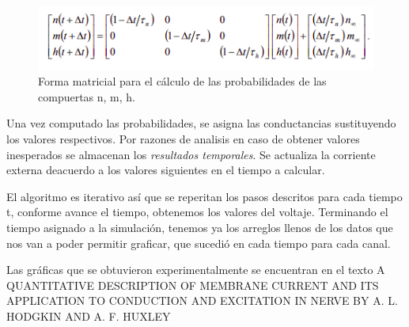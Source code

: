 \begin{figure}[H]
 \centering
 \includegraphics[scale=0.7]{../Figuras/matrix.png}
 \caption{Forma matricial para el cálculo de las probabilidades de las compuertas n, m, h.}
 \label{fig:matriX}
\end{figure}

Una vez computado las probabilidades, se asigna las conductancias sustituyendo los valores respectivos. Por razones de analisis en caso de obtener valores inesperados se almacenan los \emph{resultados temporales}. Se actualiza la corriente externa deacuerdo a los valores siguientes en el tiempo a calcular.

El algoritmo es iterativo así que se reperitan los pasos descritos para cada tiempo t, conforme avance el tiempo, obtenemos los valores del voltaje. Terminando el tiempo asignado a la simulación, tenemos ya los arreglos llenos de los datos que nos van a poder permitir graficar, que sucedió en cada tiempo para cada canal. 

Las gráficas que se obtuvieron experimentalmente se encuentran en el texto A QUANTITATIVE DESCRIPTION OF MEMBRANE CURRENT AND ITS APPLICATION TO CONDUCTION AND EXCITATION IN NERVE BY A. L. HODGKIN AND A. F. HUXLEY \parencite{HH52}

